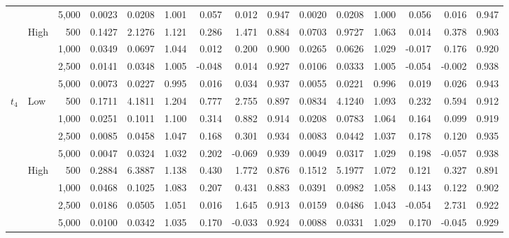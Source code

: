 \begin{table}
\begin{tabular}{llr*{12}{r}}
 &  & 5,000 & 0.0023 & 0.0208 & 1.001 & 0.057 & 0.012 & 0.947 & 0.0020 & 0.0208 & 1.000 & 0.056 & 0.016 & 0.947\\
\addlinespace[1pt]
 & High & 500 & 0.1427 & 2.1276 & 1.121 & 0.286 & 1.471 & 0.884 & 0.0703 & 0.9727 & 1.063 & 0.014 & 0.378 & 0.903\\
 &  & 1,000 & 0.0349 & 0.0697 & 1.044 & 0.012 & 0.200 & 0.900 & 0.0265 & 0.0626 & 1.029 & -0.017 & 0.176 & 0.920\\
 &  & 2,500 & 0.0141 & 0.0348 & 1.005 & -0.048 & 0.014 & 0.927 & 0.0106 & 0.0333 & 1.005 & -0.054 & -0.002 & 0.938\\
 &  & 5,000 & 0.0073 & 0.0227 & 0.995 & 0.016 & 0.034 & 0.937 & 0.0055 & 0.0221 & 0.996 & 0.019 & 0.026 & 0.943\\
\addlinespace[3pt]
$t_4$ & Low & 500 & 0.1711 & 4.1811 & 1.204 & 0.777 & 2.755 & 0.897 & 0.0834 & 4.1240 & 1.093 & 0.232 & 0.594 & 0.912\\
 &  & 1,000 & 0.0251 & 0.1011 & 1.100 & 0.314 & 0.882 & 0.914 & 0.0208 & 0.0783 & 1.064 & 0.164 & 0.099 & 0.919\\
 &  & 2,500 & 0.0085 & 0.0458 & 1.047 & 0.168 & 0.301 & 0.934 & 0.0083 & 0.0442 & 1.037 & 0.178 & 0.120 & 0.935\\
 &  & 5,000 & 0.0047 & 0.0324 & 1.032 & 0.202 & -0.069 & 0.939 & 0.0049 & 0.0317 & 1.029 & 0.198 & -0.057 & 0.938\\
\addlinespace[1pt]
 & High & 500 & 0.2884 & 6.3887 & 1.138 & 0.430 & 1.772 & 0.876 & 0.1512 & 5.1977 & 1.072 & 0.121 & 0.327 & 0.891\\
 &  & 1,000 & 0.0468 & 0.1025 & 1.083 & 0.207 & 0.431 & 0.883 & 0.0391 & 0.0982 & 1.058 & 0.143 & 0.122 & 0.902\\
 &  & 2,500 & 0.0186 & 0.0505 & 1.051 & 0.016 & 1.645 & 0.913 & 0.0159 & 0.0486 & 1.043 & -0.054 & 2.731 & 0.922\\
 &  & 5,000 & 0.0100 & 0.0342 & 1.035 & 0.170 & -0.033 & 0.924 & 0.0088 & 0.0331 & 1.029 & 0.170 & -0.045 & 0.929\\
\bottomrule
\end{tabular}
\begin{minipage}{0.98\textheight}\small\vspace{4pt}

\end{minipage}
\end{table}
